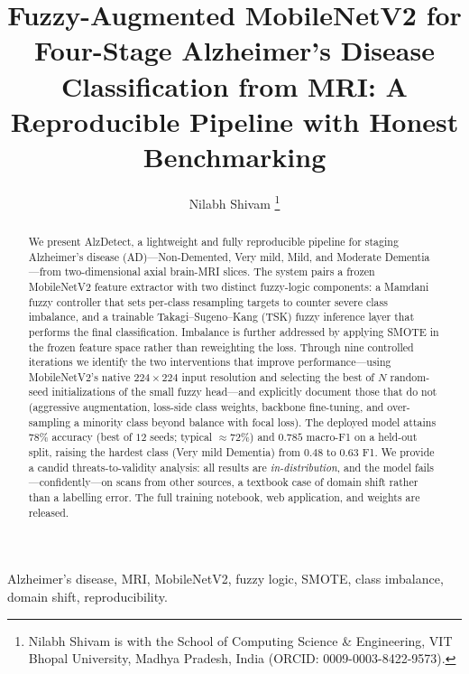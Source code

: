 \documentclass[journal]{IEEEtran}
\begin{document}
\title{Fuzzy-Augmented MobileNetV2 for Four-Stage Alzheimer's Disease Classification from MRI: A Reproducible Pipeline with Honest Benchmarking}

\author{Nilabh Shivam%
\thanks{Nilabh Shivam is with the School of Computing Science \& Engineering,
VIT Bhopal University, Madhya Pradesh, India
(ORCID: 0009-0003-8422-9573).}
}

\markboth{}{}
\maketitle

\begin{abstract}
We present AlzDetect, a lightweight and fully reproducible pipeline for staging
Alzheimer's disease (AD)---Non-Demented, Very mild, Mild, and Moderate
Dementia---from two-dimensional axial brain-MRI slices. The system pairs a frozen
MobileNetV2 feature extractor with two distinct fuzzy-logic components: a Mamdani
fuzzy controller that sets per-class resampling targets to counter severe class
imbalance, and a trainable Takagi--Sugeno--Kang (TSK) fuzzy inference layer that
performs the final classification. Imbalance is further addressed by applying
SMOTE in the frozen feature space rather than reweighting the loss. Through nine
controlled iterations we identify the two interventions that improve
performance---using MobileNetV2's native $224\times224$ input resolution and
selecting the best of $N$ random-seed initializations of the small fuzzy
head---and explicitly document those that do not (aggressive augmentation,
loss-side class weights, backbone fine-tuning, and over-sampling a minority class
beyond balance with focal loss). The deployed model attains $78\%$ accuracy (best
of $12$ seeds; typical $\approx72\%$) and $0.785$ macro-F1 on a held-out split,
raising the hardest class (Very mild Dementia) from $0.48$ to $0.63$ F1. We
provide a candid threats-to-validity analysis: all results are
\emph{in-distribution}, and the model fails---confidently---on scans from other
sources, a textbook case of domain shift rather than a labelling error. The full
training notebook, web application, and weights are released.
\end{abstract}

\begin{IEEEkeywords}
Alzheimer's disease, MRI, MobileNetV2, fuzzy logic, SMOTE, class imbalance,
domain shift, reproducibility.
\end{IEEEkeywords}
\end{document}
